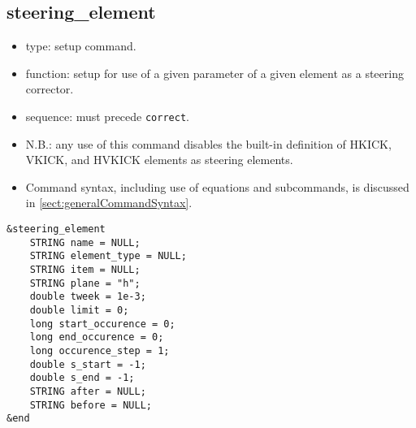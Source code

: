 \documentclass[11pt]{article}
\begin{document}
\subsection{steering\_element \label{subsec:steeringelement}}

\begin{itemize}
\item type: setup command.
\item function: setup for use of a given parameter of a given element as a steering corrector.
\item sequence: must precede \verb|correct|.
\item N.B.: any use of this command disables the built-in definition of HKICK, VKICK, and HVKICK elements
  as steering elements.
\item Command syntax, including use of equations and subcommands, is discussed in \ref{sect:generalCommandSyntax}.
\end{itemize}

\begin{verbatim}
&steering_element
    STRING name = NULL;
    STRING element_type = NULL;
    STRING item = NULL;
    STRING plane = "h";
    double tweek = 1e-3;
    double limit = 0;
    long start_occurence = 0;
    long end_occurence = 0;
    long occurence_step = 1;
    double s_start = -1;
    double s_end = -1;
    STRING after = NULL;
    STRING before = NULL;
&end
\end{verbatim}
\end{document}
